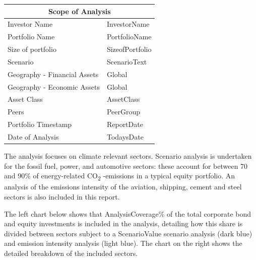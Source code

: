 \documentclass[10pt,table,a4]{article}\usepackage[]{graphicx}\usepackage[]{color}
\begin{document}
\begin{multicols}{2}
		\begin{center}
			{
				\setlength{\tabcolsep}{10pt} %
				\renewcommand{\arraystretch}{1.5} %
				\begin{tabular}{ p{.35\linewidth} p{.49\linewidth} }
					\hline
					\multicolumn{2}{c}{\textbf{Scope of Analysis}} \\
					\hline
					Investor Name & InvestorName \\ 
					Portfolio Name & PortfolioName \\ 
					Size of portfolio & SizeofPortfolio \\ 
					Scenario & ScenarioText \\ 
					Geography - \newline Financial Assets & Global \\ 
					Geography - \newline Economic Assets & Global \\ 
					Asset Class & AssetClass \\ 
					Peers & PeerGroup \\
					Portfolio Timestamp & ReportDate \\ 
					Date of Analysis & TodaysDate \\ 
					\hline
				\end{tabular}
			}
			
		\end{center}
		
		The analysis focuses on climate relevant sectors. Scenario analysis is undertaken for the fossil fuel, power, and automotive sectors: these account for between 70 and 90\% of energy-related CO\textsubscript{2} -emissions in a typical equity portfolio. An analysis of the emissions intensity of the aviation, shipping, cement and steel sectors is also included in this report.
		
		The left chart below shows that AnalysisCoverage\% of the total corporate bond and equity investments is included in the analysis, detailing how this share is divided between sectors subject to a ScenarioValue scenario analysis (dark blue) and emission intensity analysis (light blue). The chart on the right shows the detailed breakdown of the included sectors.
		
		
		
		
		\vspace{0.cm}
		
		
	\end{multicols}	
	
\end{document}
